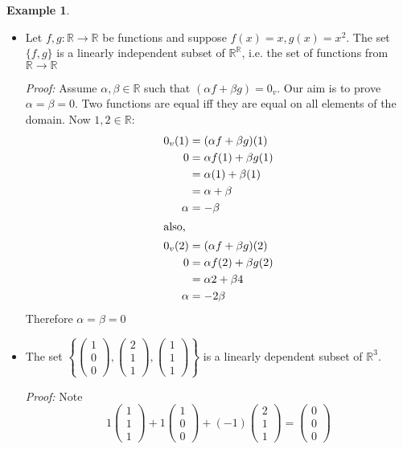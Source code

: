 \documentclass{report}
\theoremstyle{remark}
\theoremstyle{definition}
\theoremstyle{definition}
\newtheorem{example}[theorem]{Example}
\theoremstyle{theorem}
\begin{document}
\begin{example}
\begin{itemize}
\item Let $f, g: \mathbb{R} \rightarrow \mathbb{R}$ be functions and suppose $f(x) = x, g(x) = x^2$. The set $\{f, g\}$ is a linearly independent subset of $\mathbb{R}^{\mathbb{R}}$, i.e. the set of functions from $\mathbb{R} \rightarrow \mathbb{R}$\par
\emph{Proof:} Assume $\alpha, \beta \in \mathbb{R}$ such that $(\alpha f + \beta g) = 0_v$. Our aim is to prove $\alpha = \beta = 0$. Two functions are equal iff they are equal on all elements of the domain. Now $1, 2 \in \mathbb{R}$:
\begin{align*}
    0_v(1) &= (\alpha f + \beta g)(1)\\
    0 &= \alpha f(1) + \beta g(1)\\
    &= \alpha(1) + \beta(1)\\
    &= \alpha + \beta\\
    \alpha &= -\beta\\
    \intertext{also,}
    0_v(2) &= (\alpha f + \beta g)(2)\\
    0&= \alpha f(2) + \beta g(2)\\
    &= \alpha 2 + \beta 4\\
    \alpha &= -2 \beta
\end{align*}
Therefore $\alpha = \beta = 0$
\item The set $\left\{ \begin{pmatrix}1\\0\\0\end{pmatrix}, \begin{pmatrix}2\\1\\1\end{pmatrix}, \begin{pmatrix}1\\1\\1\end{pmatrix} \right\}$ is a linearly dependent subset of $\mathbb{R}^3$. \par
\emph{Proof:} Note
\[ 1 \begin{pmatrix}1\\1\\1\end{pmatrix} + 1 \begin{pmatrix}1\\0\\0\end{pmatrix} + (-1)\begin{pmatrix}2\\1\\1\end{pmatrix} = \begin{pmatrix}0\\0\\0\end{pmatrix}\]

\end{itemize}
\end{example}
\end{document}
